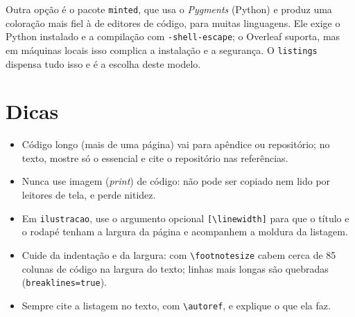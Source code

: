 
Outra opção é o pacote \texttt{minted}, que usa o \emph{Pygments} (Python) e produz uma
coloração mais fiel à de editores de código, para muitas linguagens. Ele exige o Python
instalado e a compilação com \texttt{-shell-escape}; o Overleaf suporta, mas em máquinas
locais isso complica a instalação e a segurança. O \texttt{listings} dispensa tudo isso e é
a escolha deste modelo.

\section{Dicas}

\begin{itemize}
  \item Código longo (mais de uma página) vai para apêndice ou repositório; no texto, mostre
        só o essencial e cite o repositório nas referências.
  \item Nunca use imagem (\emph{print}) de código: não pode ser copiado nem lido por leitores
        de tela, e perde nitidez.
  \item Em \texttt{ilustracao}, use o argumento opcional \texttt{[\textbackslash linewidth]} para que
        o título e o rodapé tenham a largura da página e acompanhem a moldura da listagem.
  \item Cuide da indentação e da largura: com \texttt{\textbackslash footnotesize} cabem cerca de
        85 colunas de código na largura do texto; linhas mais longas são quebradas
        (\texttt{breaklines=true}).
  \item Sempre cite a listagem no texto, com \texttt{\textbackslash autoref}, e explique o que
        ela faz.
\end{itemize}
